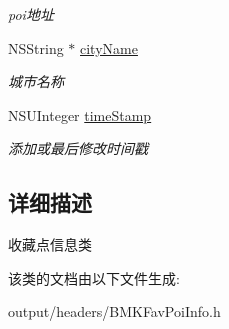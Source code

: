 \begin{DoxyCompactItemize}
\begin{DoxyCompactList}\small\item\em poi地址 \end{DoxyCompactList}\item 
\hypertarget{interface_b_m_k_fav_poi_info_a55db52983ec33430f95d22b9a3f329ca}{}N\+S\+String $\ast$ \hyperlink{interface_b_m_k_fav_poi_info_a55db52983ec33430f95d22b9a3f329ca}{city\+Name}\label{interface_b_m_k_fav_poi_info_a55db52983ec33430f95d22b9a3f329ca}

\begin{DoxyCompactList}\small\item\em 城市名称 \end{DoxyCompactList}\item 
\hypertarget{interface_b_m_k_fav_poi_info_a19dbceb65e593040a2bb5ff1785ab1c2}{}N\+S\+U\+Integer \hyperlink{interface_b_m_k_fav_poi_info_a19dbceb65e593040a2bb5ff1785ab1c2}{time\+Stamp}\label{interface_b_m_k_fav_poi_info_a19dbceb65e593040a2bb5ff1785ab1c2}

\begin{DoxyCompactList}\small\item\em 添加或最后修改时间戳 \end{DoxyCompactList}\end{DoxyCompactItemize}


\subsection{详细描述}
收藏点信息类 

该类的文档由以下文件生成\+:\begin{DoxyCompactItemize}
\item 
output/headers/B\+M\+K\+Fav\+Poi\+Info.\+h\end{DoxyCompactItemize}
